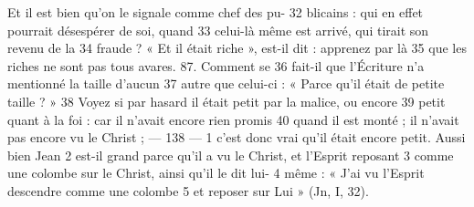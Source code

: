 Et il est bien qu'on le signale comme chef des pu-	 
32	 	blicains : qui en effet pourrait désespérer de soi, quand	 
33	 	celui-là même est arrivé, qui tirait son revenu de la	 
34	 	fraude ? « Et il était riche », est-il dit : apprenez par là	 
35	 	que les riches ne sont pas tous avares. 87. Comment se	 
36	 	fait-il que l'Écriture n'a mentionné la taille d'aucun	 
37	 	autre que celui-ci : « Parce qu'il était de petite taille ? »	 
38	 	Voyez si par hasard il était petit par la malice, ou encore	 
39	 	petit quant à la foi : car il n'avait encore rien promis	 
40	 	quand il est monté ; il n'avait pas encore vu le Christ ;	 
 	--- 138 ---	 
1	 	c'est donc vrai qu'il était encore petit. Aussi bien Jean	 
2	 	est-il grand parce qu'il a vu le Christ, et l'Esprit reposant	 
3	 	comme une colombe sur le Christ, ainsi qu'il le dit lui-	 
4	 	même : « J'ai vu l'Esprit descendre comme une colombe	 
5	 	et reposer sur Lui » (Jn, I, 32).
